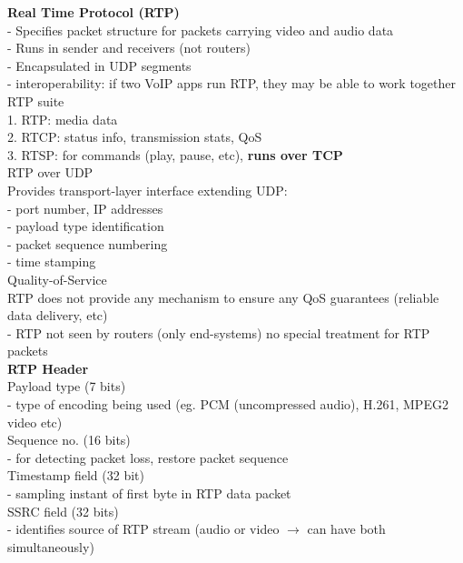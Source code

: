 \documentclass[10pt, a4paper]{article}
\newcommand{\highlight}[1]{{\color{red}\textbf{#1}}}
\newcommand{\red}[1]{{\color{red}#1}}
\begin{document}
\begin{multicols*}{3}
		\textbf{Real Time Protocol (RTP)}\\
		- Specifies packet structure for packets carrying video and audio data\\
		- Runs in sender and receivers (not routers)\\
		- Encapsulated in UDP segments\\
		- interoperability: if two VoIP apps run RTP, they may be able to work together\\

		RTP suite\\
		1. RTP: media data\\
		2. RTCP: status info, transmission stats, QoS\\
		3. RTSP: for commands (play, pause, etc), \highlight{runs over TCP}\\

		RTP over UDP\\
		Provides transport-layer interface extending UDP:\\
		- port number, IP addresses\\
		- payload type identification\\
		- packet sequence numbering\\
		- time stamping\\

		Quality-of-Service\\
		RTP does \red{not} provide any mechanism to ensure any QoS guarantees (reliable data delivery, etc)\\
		- RTP \red{not} seen by routers (only end-systems) no special treatment for RTP packets\\

		\textbf{RTP Header}\\
		Payload type (7 bits)\\
		- type of encoding being used (eg. PCM (uncompressed audio), H.261, MPEG2 video etc)\\

		Sequence no. (16 bits)\\
		- for detecting packet loss, restore packet sequence\\

		Timestamp field (32 bit)\\
		- sampling instant of first byte in RTP data packet\\

		SSRC field (32 bits)\\
		- identifies source of RTP stream (audio or video $\rightarrow$ can have both simultaneously)\\


\end{multicols*}
\end{document}
